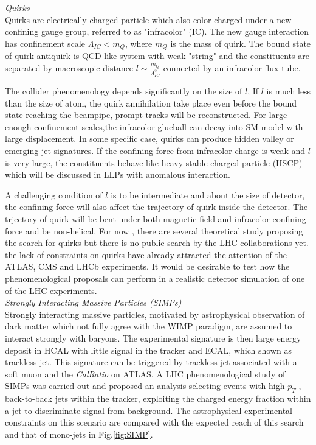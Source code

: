 \textit{Quirks}\\

Quirks are electrically charged particle which also color charged under a new confining gauge group, referred to as "infracolor" (IC). The new gauge interaction has confinement scale $\Lambda_{IC} < m_Q$, where $m_Q$ is the mass of quirk. The bound state of quirk-antiquirk is QCD-like system with weak "string" and the constituents are separated by macroscopic distance $l \sim \frac{m_Q}{\Lambda^2_{IC}}$ connected by an infracolor flux tube.

The collider phenomenology depends significantly on the size of $l$, If $l$ is much less than the size of atom, the quirk annihilation take place even before the bound state reaching the beampipe, prompt tracks will be reconstructed. For large enough confinement scales,the infracolor glueball can decay into SM model with large displacement. In some specific case, quirks can produce hidden valley or emerging jet signatures. If the confining force from infracolor charge is weak and $l$ is very large, the constituents behave like heavy stable charged particle (HSCP) which will be discussed in LLPs with anomalous interaction.

A challenging condition of $l$ is to be intermediate and about the size of detector, the confining force will also affect the trajectory of quirk inside the detector. The trjectory of quirk will be bent under both magnetic field and infracolor confining force and be non-helical. For now , there are several theoretical study proposing the search for quirks but there is no public search by the LHC collaborations yet. the lack of constraints on quirks have already attracted the attention of the ATLAS, CMS and LHCb experiments. It would be desirable to test how the phenomenological proposals can perform in a realistic detector simulation of one of the LHC experiments.\\

\textit{Strongly Interacting Massive Particles (SIMPs)}
\\

Strongly interacting massive particles, motivated by astrophysical observation of dark matter which not fully agree with the WIMP paradigm, are assumed to interact strongly with baryons. The experimental signature is then large energy deposit in HCAL with little signal in the tracker and ECAL, which shown as trackless jet. This signature can be triggered by trackless jet associated with a soft muon and the \textit{CalRatio} on ATLAS. A LHC phenomenological study of SIMPs was carried out and proposed an analysis selecting events with high-$p_T$ , back-to-back jets within the tracker, exploiting the charged energy fraction within a jet to discriminate signal from background. The astrophysical experimental constraints on this scenario are compared with the expected reach of this search and that of mono-jets in Fig.\ref{fig:SIMP}.


